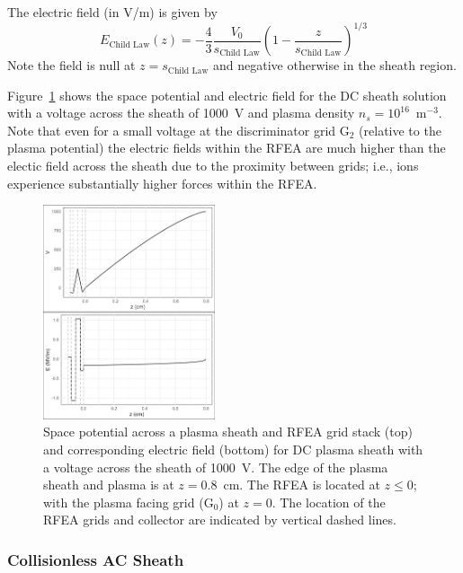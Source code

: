 The electric field (in V/m) is given by
\begin{equation}
E_\text{Child Law}(z) = -\frac{4}{3} \frac{V_0}{s_\text{Child Law}} \left( 1 - \frac{z}{s_\text{Child Law}}  \right)^{1/3}
\end{equation}
Note the field is null at $z=s_\text{Child Law}$ and negative otherwise in the sheath region. 

Figure~\ref{fig:DCpotentialField} shows the space potential and electric field for the DC sheath solution with a voltage across the sheath of 1000~V and plasma density $n_s = 10^{16}$~m$^{-3}$. Note that even for a small voltage at the discriminator grid G$_2$ (relative to the plasma potential) the electric fields within the RFEA are much higher than the electic field across the sheath due to the proximity between grids; i.e., ions experience substantially higher forces within the RFEA. 

\begin{figure}[htbp]
\centering
\includegraphics[width=0.45\textwidth]{Figures/VEz2DC1kVStack2332.jpeg}
\caption{Space potential across a plasma sheath and RFEA grid stack (top) and corresponding electric field (bottom) for DC plasma sheath with a voltage across the sheath of 1000~V. The edge of the plasma sheath and plasma is at $z=0.8$~cm. The RFEA is located at $z\le0$; with the plasma facing grid (G$_0$) at $z=0$. The location of the RFEA grids and collector are indicated by vertical dashed lines.}
\label{fig:DCpotentialField}
\end{figure}



\subsubsection{Collisionless AC Sheath}

